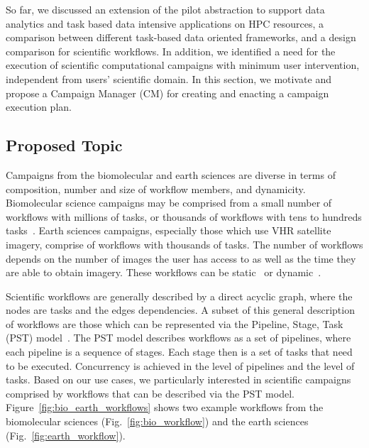 \label{research}
So far, we discussed an extension of the pilot abstraction to support data analytics and task based data intensive applications on HPC resources, a comparison between different task-based data oriented frameworks, and a design comparison for scientific workflows.
In addition, we identified a need for the execution of scientific computational campaigns with minimum user intervention, independent from users' scientific domain.
In this section, we motivate and propose a Campaign Manager (CM) for creating and enacting a campaign execution plan.


\subsection{Proposed Topic}
Campaigns from the biomolecular and earth sciences are diverse in terms of composition, number and size of workflow members, and dynamicity.
Biomolecular science campaigns may be comprised from a small number of workflows with millions of tasks, or thousands of workflows with tens to hundreds tasks~\cite{dakka2018high}. 
Earth sciences campaigns, especially those which use VHR satellite imagery, comprise of workflows with thousands of tasks.
The number of workflows depends on the number of images the user has access to as well as the time they are able to obtain imagery.
These workflows can be static~\cite{paraskevakos2019workflow} or dynamic~\cite{dakka2018high}.

Scientific workflows are generally described by a direct acyclic graph, where the nodes are tasks and the edges dependencies.
A subset of this general description of workflows are those which can be represented via the Pipeline, Stage, Task (PST) model~\cite{balasubramanian2018harnessing}.
The PST model describes workflows as a set of pipelines, where each pipeline is a sequence of stages.
Each stage then is a set of tasks that need to be executed.
Concurrency is achieved in the level of pipelines and the level of tasks. 
Based on our use cases, we particularly interested in scientific campaigns comprised by workflows that can be described via the PST model.
Figure~\ref{fig:bio_earth_workflows} shows two example workflows from the biomolecular sciences (Fig.~\ref{fig:bio_workflow}) and the earth sciences (Fig.~\ref{fig:earth_workflow}). 

